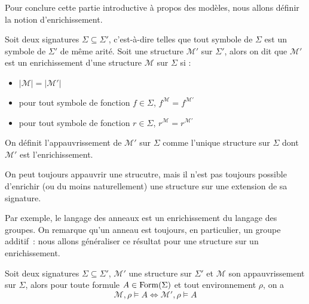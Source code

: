 Pour conclure cette partie introductive à propos des modèles, nous allons
définir la notion d'enrichissement.

\begin{definition}[Enrichissement]
  Soit deux signatures $\Sigma\subseteq\Sigma'$, c'est-à-dire telles que tout
  symbole de $\Sigma$ est un symbole de $\Sigma'$ de même arité. Soit une
  structure $\mathcal M'$ sur $\Sigma'$, alors on dit que $\mathcal M'$ est un
  enrichissement d'une structure $\mathcal M$ sur $\Sigma$ si :
  \begin{itemize}
  \item $|\mathcal M| = |\mathcal M'|$
  \item pour tout symbole de fonction $f\in \Sigma$,
    $f^{\mathcal M} = f^{\mathcal M'}$
  \item pour tout symbole de fonction $r\in \Sigma$,
    $r^{\mathcal M} = r^{\mathcal M'}$
  \end{itemize}

  On définit l'appauvrissement de $\mathcal M'$ sur $\Sigma$ comme l'unique
  structure sur $\Sigma$ dont $\mathcal M'$ est l'enrichissement.
\end{definition}

\begin{remark}
  On peut toujours appauvrir une strucutre, mais il n'est pas toujours possible
  d'enrichir (ou du moins naturellement) une structure sur une extension de sa
  signature.
\end{remark}

Par exemple, le langage des anneaux est un enrichissement du langage des
groupes. On remarque qu'un anneau est toujours, en particulier, un groupe
additif~: nous allons généraliser ce résultat pour une structure sur un
enrichissement.

\begin{proposition}
  Soit deux signatures $\Sigma\subseteq\Sigma'$, $\mathcal M'$ une structure
  sur $\Sigma'$ et $\mathcal M$ son appauvrissement sur $\Sigma$, alors pour
  toute formule $A\in\operatorname{Form}(\Sigma)$ et tout environnement $\rho$, on a
  \[\mathcal M,\rho\models A \iff \mathcal M',\rho\models A\]
\end{proposition}

